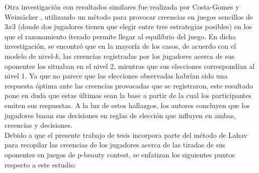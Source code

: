 Otra investigación con resultados similares fue realizada por Costa-Gomes y Weizsäcker \parencite*{Costa-Gomes2008}, utilizando un método para provocar creencias en juegos sencillos de $3x3$ (donde dos jugadores tienen que elegir entre tres estrategias posibles) en los que el razonamiento iterado permite llegar al equilibrio del juego. En dicha investigación, se encontró que en la mayoría de los casos, de acuerdo con el modelo de nivel-$k$, las creencias registradas por los jugadores acerca de sus oponentes los situaban en el nivel $2$, mientras que sus elecciones correspondían al nivel $1$. Ya que no parece que las  elecciones observadas habrían sido una respuesta óptima ante las creencias provocadas que se registraron, este resultado pone en duda que estas últimas sean la base a partir de la cual los participantes emiten sus respuestas. A la luz de estos hallazgos, los autores concluyen que los jugadores basan sus decisiones en reglas de elección que influyen en ambas, creencias y decisiones.\\

Debido a que el presente trabajo de tesis incorpora parte del método de Lahav \parencite*{Lahav2015} para recopilar las creencias de los jugadores acerca de las tiradas de sus oponentes en juegos de p-beauty contest, se enfatizan los siguientes puntos respecto a este estudio: \\

